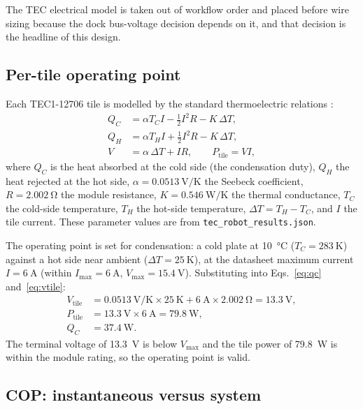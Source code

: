 \documentclass[11pt,a4paper]{article}
\begin{document}
The TEC electrical model is taken out of workflow order and placed before wire
sizing because the dock bus-voltage decision depends on it, and that decision is
the headline of this design.

\subsection{Per-tile operating point}

Each TEC1-12706 tile is modelled by the standard thermoelectric relations
\cite{tec12706ds,riffat2003peltier}:
\begin{align}
  Q_C &= \alpha T_C I - \tfrac{1}{2} I^2 R - K\,\Delta T, \label{eq:qc}\\
  Q_H &= \alpha T_H I + \tfrac{1}{2} I^2 R - K\,\Delta T, \label{eq:qh}\\
  V   &= \alpha\,\Delta T + I R, \qquad P_{\text{tile}} = V I, \label{eq:vtile}
\end{align}
where $Q_C$ is the heat absorbed at the cold side (the condensation duty), $Q_H$
the heat rejected at the hot side, $\alpha=\SI{0.0513}{\volt\per\kelvin}$ the
Seebeck coefficient, $R=\SI{2.002}{\ohm}$ the module resistance,
$K=\SI{0.546}{\watt\per\kelvin}$ the thermal conductance, $T_C$ the cold-side
temperature, $T_H$ the hot-side temperature, $\Delta T = T_H - T_C$, and $I$ the
tile current. These parameter values are from
\texttt{tec\_robot\_results.json}.

The operating point is set for condensation: a cold plate at \SI{10}{\degreeCelsius}
($T_C=\SI{283}{\kelvin}$) against a hot side near ambient
($\Delta T=\SI{25}{\kelvin}$), at the datasheet maximum current
$I=\SI{6}{\ampere}$ (within $I_{\max}=\SI{6}{\ampere}$,
$V_{\max}=\SI{15.4}{\volt}$). Substituting into Eqs.~\eqref{eq:qc}
and~\eqref{eq:vtile}:
\begin{align}
  V_{\text{tile}} &= \SI{0.0513}{\volt\per\kelvin}\times\SI{25}{\kelvin}
    + \SI{6}{\ampere}\times\SI{2.002}{\ohm} = \SI{13.3}{\volt}, \\
  P_{\text{tile}} &= \SI{13.3}{\volt}\times\SI{6}{\ampere} = \SI{79.8}{\watt}, \\
  Q_C &= \SI{37.4}{\watt}.
  \label{eq:tile_op}
\end{align}
The terminal voltage of \SI{13.3}{\volt} is below $V_{\max}$ and the tile power
of \SI{79.8}{\watt} is within the module rating, so the operating point is valid.

\subsection{COP: instantaneous versus system}
\end{document}
